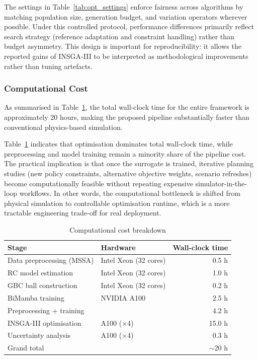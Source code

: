 \documentclass[11pt]{article}
\begin{document}
The settings in Table~\ref{tab:opt_settings} enforce fairness across algorithms by matching population size, generation budget, and variation operators wherever possible. Under this controlled protocol, performance differences primarily reflect search strategy (reference adaptation and constraint handling) rather than budget asymmetry. This design is important for reproducibility: it allows the reported gains of INSGA-III to be interpreted as methodological improvements rather than tuning artefacts.

\subsubsection{Computational Cost}

As summarised in Table~\ref{tab:comp_cost}, the total wall-clock time for the entire framework is approximately 20 hours, making the proposed pipeline substantially faster than conventional physics-based simulation.



Table~\ref{tab:comp_cost} indicates that optimisation dominates total wall-clock time, while preprocessing and model training remain a minority share of the pipeline cost. The practical implication is that once the surrogate is trained, iterative planning studies (new policy constraints, alternative objective weights, scenario refreshes) become computationally feasible without repeating expensive simulator-in-the-loop workflows. In other words, the computational bottleneck is shifted from physical simulation to controllable optimisation runtime, which is a more tractable engineering trade-off for real deployment.

\begin{table}[!htbp]
\centering
\small
\caption{Computational cost breakdown}
\label{tab:comp_cost}
\begin{tabular}{llr}
\toprule
Stage & Hardware & Wall-clock time \\
\midrule
Data preprocessing (MSSA) & Intel Xeon (32 cores) & 0.5 h \\
RC model estimation & Intel Xeon (32 cores) & 1.0 h \\
GBC ball construction & Intel Xeon (32 cores) & 0.2 h \\
BiMamba training & NVIDIA A100 & 2.5 h \\
\midrule
Preprocessing + training & & 4.2 h \\
\midrule
INSGA-III optimisation & A100 (×4) & 15.0 h \\
Uncertainty analysis & A100 (×4) & 0.3 h \\
\midrule
Grand total & & $\sim$20 h \\
\bottomrule
\end{tabular}
\end{table}
\end{document}
